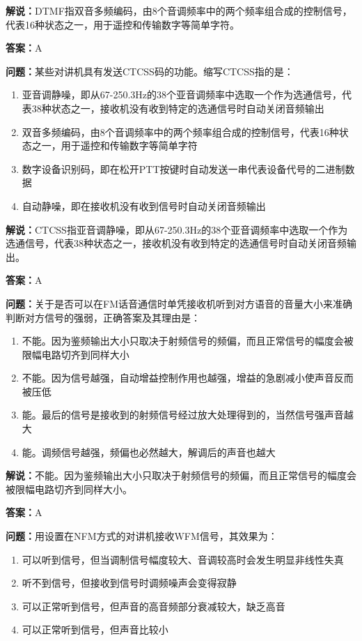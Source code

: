 \documentclass[UTF8]{ctexbook}
\begin{document}
\textbf{解说：}DTMF指双音多频编码，由8个音调频率中的两个频率组合成的控制信号，代表16种状态之一，用于遥控和传输数字等简单字符。%

\textbf{答案：}A

\textbf{问题：}某些对讲机具有发送CTCSS码的功能。缩写CTCSS指的是：

\begin{enumerate}[label=\Alph*), leftmargin=3em]
  \item 亚音调静噪，即从67-250.3Hz的38个亚音调频率中选取一个作为选通信号，代表38种状态之一，接收机没有收到特定的选通信号时自动关闭音频输出
  \item 双音多频编码，由8个音调频率中的两个频率组合成的控制信号，代表16种状态之一，用于遥控和传输数字等简单字符
  \item 数字设备识别码，即在松开PTT按键时自动发送一串代表设备代号的二进制数据
  \item 自动静噪，即在接收机没有收到信号时自动关闭音频输出
\end{enumerate}

\textbf{解说：}CTCSS指亚音调静噪，即从67-250.3Hz的38个亚音调频率中选取一个作为选通信号，代表38种状态之一，接收机没有收到特定的选通信号时自动关闭音频输出。%

\textbf{答案：}A

\textbf{问题：}关于是否可以在FM话音通信时单凭接收机听到对方语音的音量大小来准确判断对方信号的强弱，正确答案及其理由是：

\begin{enumerate}[label=\Alph*), leftmargin=3em]
  \item 不能。因为鉴频输出大小只取决于射频信号的频偏，而且正常信号的幅度会被限幅电路切齐到同样大小
  \item 不能。因为信号越强，自动增益控制作用也越强，增益的急剧减小使声音反而被压低
  \item 能。最后的信号是接收到的射频信号经过放大处理得到的，当然信号强声音越大
  \item 能。调频信号越强，频偏也必然越大，解调后的声音也越大
\end{enumerate}

\textbf{解说：}不能。因为鉴频输出大小只取决于射频信号的频偏，而且正常信号的幅度会被限幅电路切齐到同样大小。%

\textbf{答案：}A

\textbf{问题：}用设置在NFM方式的对讲机接收WFM信号，其效果为：

\begin{enumerate}[label=\Alph*), leftmargin=3em]
  \item 可以听到信号，但当调制信号幅度较大、音调较高时会发生明显非线性失真
  \item 听不到信号，但接收到信号时调频噪声会变得寂静
  \item 可以正常听到信号，但声音的高音频部分衰减较大，缺乏高音
  \item 可以正常听到信号，但声音比较小
\end{enumerate}
\end{document}
